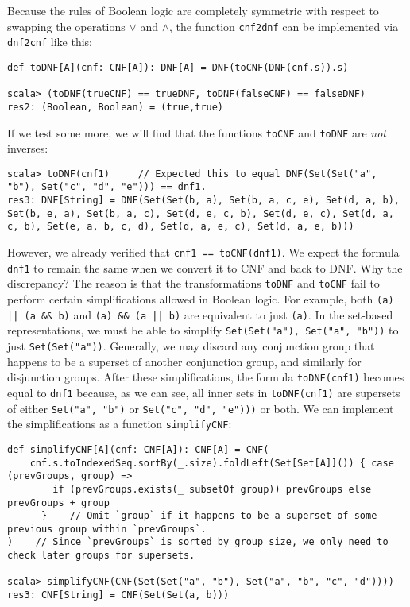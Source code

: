Because the rules of Boolean logic are completely symmetric with respect
to swapping the operations $\vee$ and $\wedge$, the function \lstinline!cnf2dnf!
can be implemented via \lstinline!dnf2cnf! like this:
\begin{lstlisting}
def toDNF[A](cnf: CNF[A]): DNF[A] = DNF(toCNF(DNF(cnf.s)).s)

scala> (toDNF(trueCNF) == trueDNF, toDNF(falseCNF) == falseDNF)
res2: (Boolean, Boolean) = (true,true)
\end{lstlisting}

If we test some more, we will find that the functions \lstinline!toCNF!
and \lstinline!toDNF! are \emph{not} inverses:
\begin{lstlisting}
scala> toDNF(cnf1)     // Expected this to equal DNF(Set(Set("a", "b"), Set("c", "d", "e"))) == dnf1.
res3: DNF[String] = DNF(Set(Set(b, a), Set(b, a, c, e), Set(d, a, b), Set(b, e, a), Set(b, a, c), Set(d, e, c, b), Set(d, e, c), Set(d, a, c, b), Set(e, a, b, c, d), Set(d, a, e, c), Set(d, a, e, b)))
\end{lstlisting}
However, we already verified that \lstinline!cnf1 == toCNF(dnf1)!.
We expect the formula \lstinline!dnf1! to remain the same when we
convert it to CNF and back to DNF. Why the discrepancy? The reason
is that the transformations \lstinline!toDNF! and \lstinline!toCNF!
fail to perform certain simplifications allowed in Boolean logic.
For example, both \lstinline!(a) || (a && b)! and \lstinline!(a) && (a || b)!
are equivalent to just \lstinline!(a)!. In the set-based representations,
we must be able to simplify \lstinline!Set(Set("a"), Set("a", "b"))!
to just \lstinline!Set(Set("a"))!. Generally, we may discard any
conjunction group that happens to be a superset of another conjunction
group, and similarly for disjunction groups. After these simplifications,
the formula \lstinline!toDNF(cnf1)! becomes equal to \lstinline!dnf1!
because, as we can see, all inner sets in \lstinline!toDNF(cnf1)!
are supersets of either \lstinline!Set("a", "b")! or \lstinline!Set("c", "d", "e")))!
or both. We can implement the simplifications as a function \lstinline!simplifyCNF!:
\begin{lstlisting}
def simplifyCNF[A](cnf: CNF[A]): CNF[A] = CNF(
    cnf.s.toIndexedSeq.sortBy(_.size).foldLeft(Set[Set[A]]()) { case (prevGroups, group) =>
        if (prevGroups.exists(_ subsetOf group)) prevGroups else prevGroups + group
      }    // Omit `group` if it happens to be a superset of some previous group within `prevGroups`.
)    // Since `prevGroups` is sorted by group size, we only need to check later groups for supersets.

scala> simplifyCNF(CNF(Set(Set("a", "b"), Set("a", "b", "c", "d"))))
res3: CNF[String] = CNF(Set(Set(a, b)))
\end{lstlisting}
